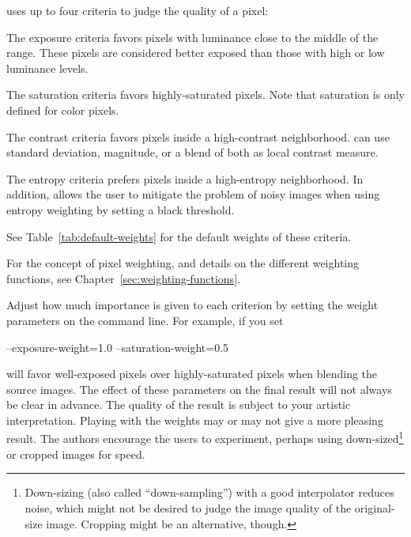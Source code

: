 \App{} uses up to four criteria to judge the quality of a pixel:

\begin{description}
\item[Exposure]\itemend The exposure criteria favors pixels with
  luminance close to the middle of the range.  These pixels are
  considered better exposed than those with high or low luminance
  levels.

\item[Saturation]\itemend The saturation criteria favors
  highly-saturated pixels.  Note that saturation is only defined for
  color pixels.

\item[Local Contrast]\itemend The contrast criteria favors pixels
  inside a high-contrast neighborhood.  \App{} can use standard
  deviation,  magnitude, or a blend of both as
  local contrast measure.

\item[Local Entropy]\itemend The entropy criteria prefers pixels
  inside a high-entropy neighborhood.  In addition, \App{} allows the
  user to mitigate the problem of noisy images when using entropy
  weighting by setting a black threshold.
\end{description}

\noindent See Table~\ref{tab:default-weights} for the default weights
of these criteria.

For the concept of pixel weighting, and details on the different
weighting functions, see Chapter~\ref{sec:weighting-functions}.

Adjust how much importance is given to each criterion by setting the
weight parameters on the command line.  For example, if you set
\begin{literal}
  --exposure-weight=1.0 --saturation-weight=0.5
\end{literal}
\App{} will favor well-exposed pixels over highly-saturated pixels
when blending the source images.  The effect of these parameters on
the final result will not always be clear in advance.  The quality of
the result is subject to your artistic interpretation.  Playing with
the weights may or may not give a more pleasing result.  The authors
encourage the users to experiment, perhaps using
down-sized\footnote{Down-sizing (also called ``down-sampling'') with a
  good interpolator reduces noise, which might not be desired to judge
  the image quality of the original-size image.  Cropping might be an
  alternative, though.} or cropped images for speed.

